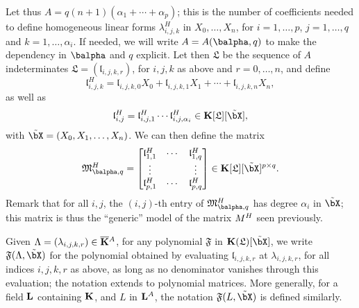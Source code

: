\documentclass[12pt]{article}
\begin{document}
Let thus $A=q(n+1)(\alpha_1 + \cdots + \alpha_p)$; this is the number
of coefficients needed to define homogeneous linear forms
$\lambda^H_{i,j,k}$ in $X_0,\dots,X_n$, for $i=1,\dots,p$,
$j=1,\dots,q$ and $k=1,\dots,\alpha_i$. If needed, we will write
$A=A(\balpha,q)$ to make the dependency in $\balpha$ and $q$ explicit.
Let then $\mathfrak{L}$ be the sequence of $A$ indeterminates
$\mathfrak{L}=(\mathfrak{l}_{i,j,k,r})$, for $i,j,k$ as above and
$r=0,\dots,n$, and define
$$\mathfrak{l}^H_{i,j,k} = \mathfrak{l}_{i,j,k,0}X_0 + \mathfrak{l}_{i,j,k,1} X_1 +\cdots + \mathfrak{l}_{i,j,k,n} X_n,$$
as well as 
$$\mathfrak{l}^H_{i,j} = \mathfrak{l}^H_{i,j,1} \cdots \mathfrak{l}^H_{i,j,\alpha_i} \in \KK[\mathfrak{L}][\tilde\bX],$$
with $\tilde\bX=(X_0,X_1,\dots,X_n)$. We can then define the
matrix
\begin{align}\label{eq:matM}
\mathfrak{M}^H_{\balpha,q}=\left [\begin{matrix}
\mathfrak{l}^H_{1,1} & \cdots & \mathfrak{l}^H_{1,q}\\
 \vdots & & \vdots\\
\mathfrak{l}^H_{p,1} & \cdots & \mathfrak{l}^H_{p,q}
  \end{matrix}\right ]\in \KK[\mathfrak{L}][\tilde\bX]^{p\times q}.  
\end{align}
Remark that for all $i,j$, the $(i,j)$-th entry of
$\mathfrak{M}^H_{\balpha,q}$ has degree $\alpha_i$ in $\tilde \bX$;
this matrix is thus the ``generic'' model of the matrix ${M}^H$ seen previously.

Given $\Lambda=(\lambda_{i,j,k,r})\in \overline{\mathbf{K}}{}^A$, for any polynomial
$\mathfrak{F}$ in $\KK(\mathfrak{L})[\tilde \bX]$, we write
$\mathfrak{F}(\Lambda,\tilde\bX)$ for the polynomial obtained by
evaluating $\mathfrak{l}_{i,j,k,r}$ at $\lambda_{i,j,k,r}$, for all
indices $i,j,k,r$ as above, as long as no denominator vanishes through
this evaluation; the notation extends to polynomial matrices. More
generally, for a field $\mathbf{L}$ containing $\mathbf{K}$, and $L$ in $\mathbf{L}^A$, the
notation $\mathfrak{F}(L,\tilde\bX)$ is defined similarly.
\end{document}
